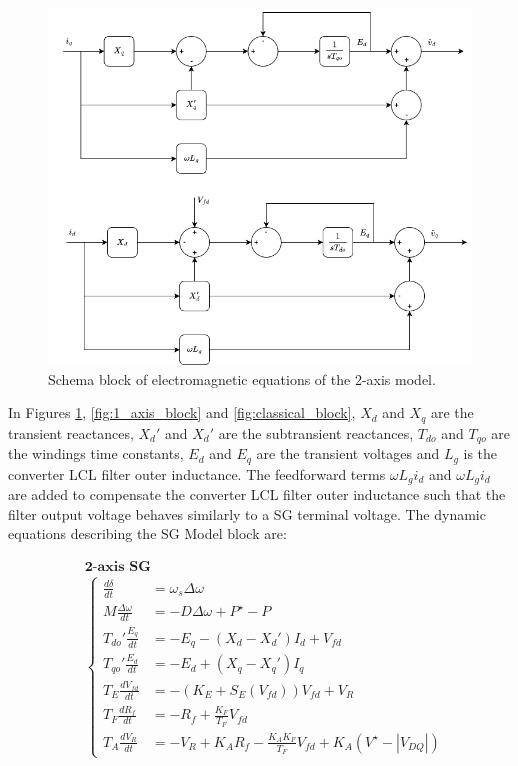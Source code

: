 \begin{figure}[ht!]
    \centering
    \includegraphics[width=12cm]{images/2_axis_block.png}
    \caption{Schema block of electromagnetic equations of the 2-axis model.}
    \label{fig:2_axis_block}
\end{figure}

In Figures \ref{fig:2_axis_block}, \ref{fig:1_axis_block} and
\ref{fig:classical_block}, $X_d$ and $X_q$ are the transient reactances, $X_d'$
and $X_d'$ are the subtransient reactances, $T_{do}$ and $T_{qo}$ are the
windings time constants, $E_d$ and $E_q$ are the transient voltages and $L_g$ is
the converter LCL filter outer inductance. The feedforward terms $\omega L_gi_d$
and $\omega L_gi_d$ are added to compensate the converter LCL filter outer
inductance such that the filter output voltage behaves similarly to a SG
terminal voltage. The dynamic equations describing the SG Model block are:

\begin{equation*}
    \begin{aligned}
        &\textbf{2-axis SG}\\
        &\begin{cases}
            \frac{d\delta}{dt} &= \omega_s \Delta\omega\\
            M\frac{\Delta\omega}{dt} &= -D\Delta\omega + P^{\star} - P\\
            T_{do}' \frac{E_q}{dt} &= -E_q - (X_d - X_d')I_d + V_{fd}\\
            T_{qo}' \frac{E_d}{dt} &= -E_d + (X_q - X_q')I_q\\
            T_E \frac{dV_{fd}}{dt} &= -\left(K_E + S_E(V_{fd})\right)V_{fd} + V_R \\
            T_F \frac{dR_f}{dt} &= -R_f + \frac{K_F}{T_F}V_{fd} \\
            T_A \frac{dV_R}{dt} &= -V_R + K_A R_f - \frac{K_A K_F}{T_F}V_{fd} + K_A (V^{\star} - |V_{DQ}|)
        \end{cases}
    \end{aligned}
\end{equation*}

